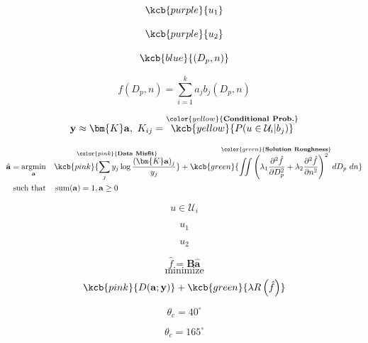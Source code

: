 $$\kcb{purple}{u_1}$$

$$\kcb{purple}{u_2}$$

$$\kcb{blue}{(D_p, n)}$$

$$f(D_p, n)=\sum_{i=1}^k a_j b_j(D_p, n)$$


$$\mathbf{y}\approx\bm{K}\mathbf{a},\ K_{ij}=\overset{\color{yellow}{\textbf{Conditional}\ \textbf{Prob.}}}{\kcb{yellow}{P(u\in \mathcal{U}_i|b_j)}}$$


\begin{align}
    \hat{\mathbf{a}}=\underset{\mathbf{a}}{\operatorname{argmin}}\quad&\overset{\color{pink}{\mathbf{Data}\ \mathbf{Misfit}}}{\kcb{pink}{\sum_j y_j \log \frac{(\bm{K}\mathbf{a})_j}{y_j}}}+\overset{\color{green}{\mathbf{Solution}\ \mathbf{Roughness}}}{\kcb{green}{\iint\left(\lambda_1\frac{\partial^2 \hat{f}}{\partial D_p^2}+\lambda_2\frac{\partial^2 \hat{f}}{\partial n^2}\right)^2\ dD_p\ dn}} \nonumber\\
    \text{such that}\quad&\operatorname{sum}(\mathbf{a})=1,\mathbf{a}\geq0\nonumber
\end{align}

\fontsize{24}{42}\selectfont
$$u\in \mathcal{U}_i$$

$$u_1$$

$$u_2$$

$$\hat{f}=\bm{B}\hat{\mathbf{a}}$$
$$\operatorname{minimize}$$
$$\kcb{pink}{D(\mathbf{a};\mathbf{y})}+\kcb{green}{\lambda R\left(\hat{f}\right)}$$

$$\theta_c=40^\circ$$

$$\theta_c=165^\circ$$